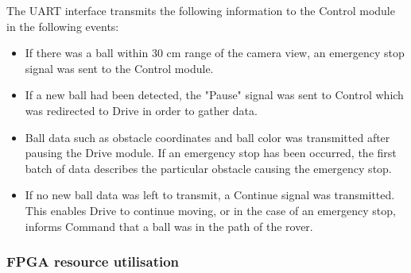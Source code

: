 \documentclass[11pt, a4paper]{article}
\begin{document}
The UART interface transmits the following information to the Control module in the following events:
\begin{itemize}
    \item If there was a ball within 30 cm range of the camera view, an emergency stop signal was sent to the Control module.
    \item If a new ball had been detected, the "Pause" signal was sent to Control which was redirected to Drive in order to gather data.
    \item Ball data such as obstacle coordinates and ball color was transmitted after pausing the Drive module. If an emergency stop has been occurred, the first batch of data describes the particular obstacle causing the emergency stop.
    \item If no new ball data was left to transmit, a Continue signal was transmitted. This enables Drive to continue moving, or in the case of an emergency stop, informs Command that a ball was in the path of the rover.
\end{itemize}

\subsubsection{FPGA resource utilisation}
\end{document}
